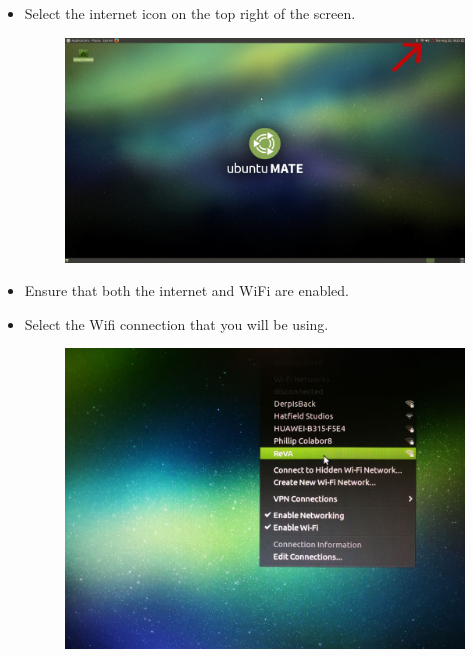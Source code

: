 \begin{itemize}
			\item Select the internet icon on the top right of the screen.
\begin{figure}[ht!]
\centering
\begin{minipage}{.9\textwidth}
  \centering
 \includegraphics[width=1.0\linewidth]{../images/manual/Desktop.png}
\end{minipage}
\end{figure}
			\item Ensure that both the internet and WiFi are enabled.
			\item Select the Wifi connection that you will be using.
\begin{figure}[ht!]
\centering
\begin{minipage}{.9\textwidth}
  \centering
  \includegraphics[width=1.0\linewidth]{../images/manual/WifiList.jpg}
\end{minipage}
\end{figure}

\end{itemize}
